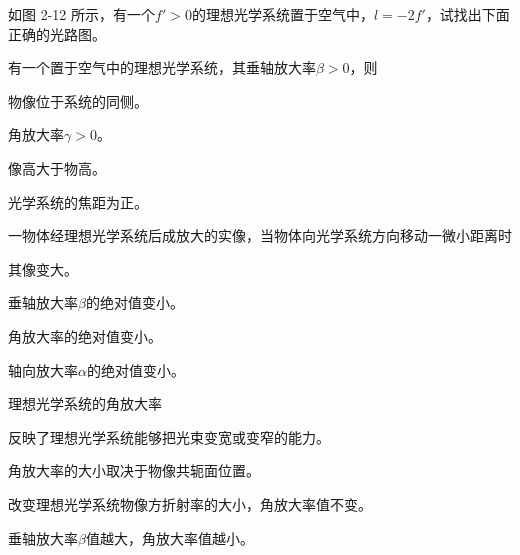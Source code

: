 \documentclass[padl, analysis, notocnum]{ExBook}
\newcommand{\answerarea}[1][3.5cm]{%
  \par\vspace{1mm}%
  \noindent{\color{themeColor!35}\rule{\linewidth}{0.4pt}}\par
  \noindent\begin{minipage}[t][#1][t]{\linewidth}\vspace{0pt}\end{minipage}\par
  \noindent{\color{themeColor!35}\rule{\linewidth}{0.4pt}}\par
}
\begin{document}
\begin{qitems}[startnum=4]
\qitem 如图 2-12 所示，有一个$f'>0$的理想光学系统置于空气中，$l=-2f'$，试找出下面正确的光路图。
\label{q:21:start}
\answerarea[1.6cm]
\label{q:21:end}
\end{qitems}

\begin{qitems}[startnum=5]
\qitem 有一个置于空气中的理想光学系统，其垂轴放大率$\beta >0$，则
\par\noindent\hspace{2em}物像位于系统的同侧。
\par\noindent\hspace{2em}角放大率$\gamma >0$。
\par\noindent\hspace{2em}像高大于物高。
\par\noindent\hspace{2em}光学系统的焦距为正。
\label{q:22:start}
\answerarea[4.0cm]
\label{q:22:end}
\end{qitems}

\begin{qitems}[startnum=6]
\qitem 一物体经理想光学系统后成放大的实像，当物体向光学系统方向移动一微小距离时
\par\noindent\hspace{2em}其像变大。
\par\noindent\hspace{2em}垂轴放大率$\beta$的绝对值变小。
\par\noindent\hspace{2em}角放大率的绝对值变小。
\par\noindent\hspace{2em}轴向放大率$\alpha$的绝对值变小。
\label{q:23:start}
\answerarea[4.0cm]
\label{q:23:end}
\end{qitems}

\begin{qitems}[startnum=7]
\qitem 理想光学系统的角放大率
\par\noindent\hspace{2em}反映了理想光学系统能够把光束变宽或变窄的能力。
\par\noindent\hspace{2em}角放大率的大小取决于物像共轭面位置。
\par\noindent\hspace{2em}改变理想光学系统物像方折射率的大小，角放大率值不变。
\par\noindent\hspace{2em}垂轴放大率$\beta$值越大，角放大率值越小。
\label{q:24:start}
\answerarea[4.0cm]
\label{q:24:end}
\end{qitems}
\end{document}
